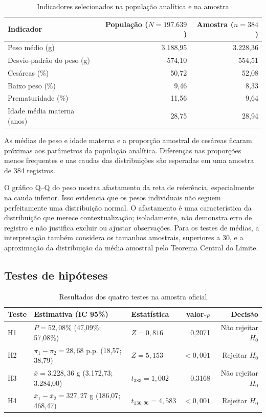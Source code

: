 \documentclass[12pt,a4paper]{article}
\begin{document}
\begin{table}[htbp]
\centering
\caption{Indicadores selecionados na população analítica e na amostra}
\label{tab:descritivas}
\begin{tabularx}{\textwidth}{>{\raggedright\arraybackslash}Xrr}
\toprule
\textbf{Indicador} & \textbf{População (\(N=197.639\))} & \textbf{Amostra (\(n=384\))}\\
\midrule
Peso médio (g) & 3.188,95 & 3.228,36\\
Desvio-padrão do peso (g) & 574,10 & 554,51\\
Cesáreas (\%) & 50,72 & 52,08\\
Baixo peso (\%) & 9,46 & 8,33\\
Prematuridade (\%) & 11,56 & 9,64\\
Idade média materna (anos) & 28,75 & 28,94\\
\bottomrule
\end{tabularx}
\end{table}

As médias de peso e idade materna e a proporção amostral de cesáreas ficaram próximas aos parâmetros da população analítica. Diferenças nas proporções menos frequentes e nas caudas das distribuições são esperadas em uma amostra de 384 registros.

O gráfico Q--Q do peso mostra afastamento da reta de referência, especialmente na cauda inferior. Isso evidencia que os pesos individuais não seguem perfeitamente uma distribuição normal. O afastamento é uma característica da distribuição que merece contextualização; isoladamente, não demonstra erro de registro e não justifica excluir ou ajustar observações. Para os testes de médias, a interpretação também considera os tamanhos amostrais, superiores a 30, e a aproximação da distribuição da média amostral pelo Teorema Central do Limite.

\subsection{Testes de hipóteses}

\begin{table}[htbp]
\centering
\small
\caption{Resultados dos quatro testes na amostra oficial}
\label{tab:testes}
\begin{tabularx}{\textwidth}{l>{\raggedright\arraybackslash}X>{\raggedright\arraybackslash}Xrr}
\toprule
\textbf{Teste} & \textbf{Estimativa (IC 95\%)} & \textbf{Estatística} & \textbf{valor-\(p\)} & \textbf{Decisão}\\
\midrule
H1 & \(P=52{,}08\%\) (47,09\%; 57,08\%) & \(Z=0{,}816\) & 0,2071 & Não rejeitar \(H_0\)\\
H2 & \(\pi_1-\pi_2=28{,}68\) p.p. (18,57; 38,79) & \(Z=5{,}153\) & \(<0{,}001\) & Rejeitar \(H_0\)\\
H3 & \(\bar{x}=3.228{,}36\) g (3.172,73; 3.284,00) & \(t_{383}=1{,}002\) & 0,3168 & Não rejeitar \(H_0\)\\
H4 & \(\bar{x}_1-\bar{x}_2=327{,}27\) g (186,07; 468,47) & \(t_{136{,}96}=4{,}583\) & \(<0{,}001\) & Rejeitar \(H_0\)\\
\bottomrule
\end{tabularx}
\end{table}
\end{document}
